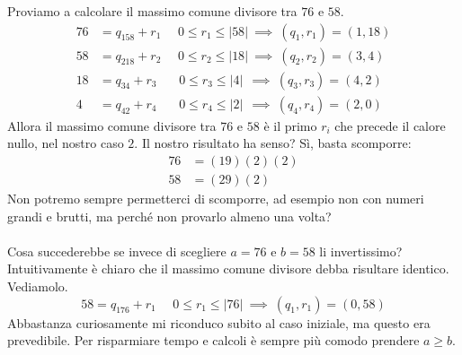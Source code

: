 \begin{esempio}
	Proviamo a calcolare il massimo comune divisore tra $76$ e $58$.
	\begin{align*}
		76 &= q_158 + r_1 \ \ \ \ \ \ 0 \leq r_1 \leq |58| \ \implies \ (q_1,r_1)=(1,18)\\
		58 &= q_218 + r_2 \ \ \ \ \ \ 0 \leq r_2 \leq |18| \ \implies \ (q_2,r_2)=(3,4)\\
		18 &= q_34 + r_3 \ \ \ \ \ \ \ \ 0 \leq r_3 \leq |4| \ \ \implies \ (q_3,r_3)=(4,2)\\
		4 &= q_42 + r_4 \ \ \ \ \ \ \ \ 0 \leq r_4 \leq |2| \ \ \implies \ (q_4,r_4)=(2,0)
	\end{align*}
	Allora il massimo comune divisore tra $76$ e $58$ è il primo $r_i$ che precede il calore nullo, nel nostro caso $2$. Il nostro risultato ha senso? Sì, basta scomporre:
	\begin{align*}
	76 &=(19)(2)(2)\\
	58&=(29)(2)
	\end{align*}
	Non potremo sempre permetterci di scomporre, ad esempio non con numeri grandi e brutti, ma perché non provarlo almeno una volta? \\ \\ Cosa succederebbe se invece di scegliere $a=76$ e $b=58$ li invertissimo? Intuitivamente è chiaro che il massimo comune divisore debba risultare identico. Vediamolo.
	\begin{equation*}
	58 = q_176 + r_1 \ \ \ \ \ \ 0 \leq r_1 \leq |76| \ \implies \ (q_1,r_1)=(0,58)
	\end{equation*}
	Abbastanza curiosamente mi riconduco subito al caso iniziale, ma questo era prevedibile. Per risparmiare tempo e calcoli è sempre più comodo prendere $a\geq b$.
\end{esempio}




